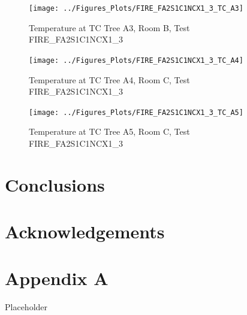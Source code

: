 \documentclass[11pt,oneside]{book}
\begin{document}
\begin{figure}[!ht]
\texttt{[image: ../Figures\_Plots/FIRE\_FA2S1C1NCX1\_3\_TC\_A3]}
\caption{Temperature at TC Tree A3, Room B, Test FIRE\_FA2S1C1NCX1\_3}
\label{fig:FIRE_FA2S1C1NCX1_3_TC_A3}
\end{figure}

\begin{figure}[!ht]
\texttt{[image: ../Figures\_Plots/FIRE\_FA2S1C1NCX1\_3\_TC\_A4]}
\caption{Temperature at TC Tree A4, Room C, Test FIRE\_FA2S1C1NCX1\_3}
\label{fig:FIRE_FA2S1C1NCX1_3_TC_A4}
\end{figure}

\begin{figure}[!ht]
\texttt{[image: ../Figures\_Plots/FIRE\_FA2S1C1NCX1\_3\_TC\_A5]}
\caption{Temperature at TC Tree A5, Room C, Test FIRE\_FA2S1C1NCX1\_3}
\label{fig:FIRE_FA2S1C1NCX1_3_TC_A5}
\end{figure}


\clearpage


\chapter{Conclusions}
\label{chap:Conclusions}

\chapter{Acknowledgements}
\label{chap:Acknowledgements}



\appendix

\chapter{Appendix A}

Placeholder
\end{document}
